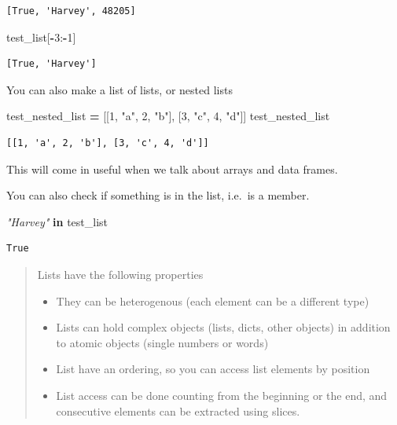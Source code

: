 \documentclass[
  letterpaper,
]{scrbook}
\newenvironment{Shaded}{\begin{snugshade}}{\end{snugshade}}
\newcommand{\CommentTok}[1]{\textcolor[rgb]{0.56,0.35,0.01}{\textit{#1}}}
\newcommand{\DecValTok}[1]{\textcolor[rgb]{0.00,0.00,0.81}{#1}}
\newcommand{\KeywordTok}[1]{\textcolor[rgb]{0.13,0.29,0.53}{\textbf{#1}}}
\newcommand{\NormalTok}[1]{#1}
\newcommand{\OperatorTok}[1]{\textcolor[rgb]{0.81,0.36,0.00}{\textbf{#1}}}
\newcommand{\StringTok}[1]{\textcolor[rgb]{0.31,0.60,0.02}{#1}}
\providecommand{\tightlist}{%
  \setlength{\itemsep}{0pt}\setlength{\parskip}{0pt}}
\begin{document}
\begin{verbatim}
[True, 'Harvey', 48205]
\end{verbatim}

\begin{Shaded}
\begin{Highlighting}[]
\NormalTok{test_list[}\OperatorTok{-}\DecValTok{3}\NormalTok{:}\OperatorTok{-}\DecValTok{1}\NormalTok{]}
\end{Highlighting}
\end{Shaded}

\begin{verbatim}
[True, 'Harvey']
\end{verbatim}

You can also make a list of lists, or nested lists

\begin{Shaded}
\begin{Highlighting}[]
\NormalTok{test_nested_list }\OperatorTok{=}\NormalTok{ [[}\DecValTok{1}\NormalTok{, }\StringTok{"a"}\NormalTok{, }\DecValTok{2}\NormalTok{, }\StringTok{"b"}\NormalTok{], [}\DecValTok{3}\NormalTok{, }\StringTok{"c"}\NormalTok{, }\DecValTok{4}\NormalTok{, }\StringTok{"d"}\NormalTok{]]}
\NormalTok{test_nested_list}
\end{Highlighting}
\end{Shaded}

\begin{verbatim}
[[1, 'a', 2, 'b'], [3, 'c', 4, 'd']]
\end{verbatim}

This will come in useful when we talk about arrays and data frames.

You can also check if something is in the list, i.e.~is a member.

\begin{Shaded}
\begin{Highlighting}[]
\CommentTok{"Harvey"} \KeywordTok{in}\NormalTok{ test_list}
\end{Highlighting}
\end{Shaded}

\begin{verbatim}
True
\end{verbatim}

\begin{quote}
Lists have the following properties

\begin{itemize}
\tightlist
\item
  They can be heterogenous (each element can be a different type)
\item
  Lists can hold complex objects (lists, dicts, other objects) in addition to atomic objects (single numbers or words)
\item
  List have an ordering, so you can access list elements by position
\item
  List access can be done counting from the beginning or the end, and consecutive elements can be extracted using slices.
\end{itemize}
\end{quote}
\end{document}
